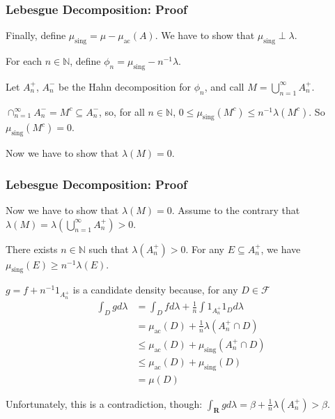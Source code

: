 \documentclass[handout]{beamer}
\begin{document}
\frame
{
\frametitle{Lebesgue Decomposition: Proof} 

Finally, define $\mu_{\text{sing}} = \mu - \mu_{\text{ac}}(A)$. We have to show that $\mu_{\text{sing}} \perp \lambda$.
\newline

For each $n \in \mathbb{N}$, define $\phi_n = \mu_{\text{sing}} - n^{-1}\lambda$.
\newline

Let $A^+_n$, $A^-_n$ be the Hahn decomposition for $\phi_n$, and call $M = \bigcup_{n=1}^{\infty} A^+_n$. 
\newline

$\cap_{n=1}^\infty A^-_n = M^c \subseteq A_n^-$, so, for all $n \in \mathbb{N}$, $0 \le \mu_{\text{sing}}(M^c) \le n^{-1}\lambda(M^c).$ So $\mu_{\text{sing}}(M^c) = 0$. 
\newline


Now we have to show that $\lambda(M) = 0$.




}


\frame
{
\frametitle{Lebesgue Decomposition: Proof} 


Now we have to show that $\lambda(M) = 0$. Assume to the contrary that $\lambda(M) = \lambda\left(\bigcup_{n=1}^{\infty} A^+_n \right) > 0$.
\newline

There exists $n \in \mathbb{N}$ such that $\lambda(A_n^+) > 0$. For any $E \subseteq A_n^+$, we have $\mu_{\text{sing}}(E) \ge n^{-1}\lambda(E)$.
\newline

$g = f + n^{-1}1_{A_n^+}$ is a candidate density because, for any $D \in \mathcal{F}$
\begin{align*}
\int_D g d\lambda &= \int_D f d\lambda  + \frac{1}{n}\int1_{A_n^+}1_{D}d\lambda \\
&= \mu_{\text{ac}}(D) + \frac{1}{n}\lambda\left(A_n^+ \cap D \right) \\
&\le \mu_{\text{ac}}(D) + \mu_{\text{sing}}(A_n^+ \cap D) \\
&\le \mu_{\text{ac}}(D) + \mu_{\text{sing}}( D) \\
&= \mu(D)
\end{align*}

Unfortunately, this is a contradiction, though: $
\int_{\mathbf{R}} g d\lambda = \beta + \frac{1}{n}\lambda(A_n^+) > \beta.
$




}
\end{document}
